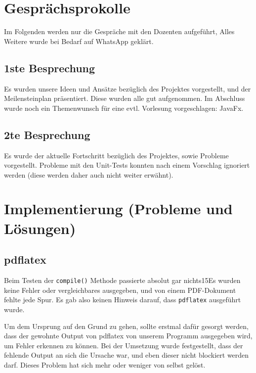 \documentclass[stu, a4paper, 11pt, floatsintext]{apa7}
\begin{document}
\clearpage

\section{Gesprächsprokolle}

\noindent Im Folgenden werden nur die Gespräche mit den Dozenten aufgeführt,
Alles Weitere wurde bei Bedarf auf WhatsApp geklärt.

\subsection{1ste Besprechung}

\noindent Es wurden unsere Ideen und Ansätze bezüglich des Projektes vorgestellt,
und der Meilensteinplan präsentiert.
Diese wurden alle gut aufgenommen.
Im Abschluss wurde noch ein Themenwunsch für eine evtl. Vorlesung vorgeschlagen: JavaFx.

\subsection{2te Besprechung}

\noindent Es wurde der aktuelle Fortschritt bezüglich des Projektes, sowie Probleme vorgestellt.
Probleme mit den Unit-Tests konnten nach einem Vorschlag ignoriert werden (diese werden daher auch nicht weiter erwähnt).

\clearpage

\section{Implementierung (Probleme und Lösungen)}

\subsection{pdflatex}

\noindent Beim Testen der \texttt{compile()} Methode passierte absolut gar nichts15Es wurden keine Fehler oder vergleichbares ausgegeben, und von einem PDF-Dokument fehlte jede Spur.
Es gab also keinen Hinweis darauf, dass \texttt{pdflatex} ausgeführt wurde.

Um dem Ursprung auf den Grund zu gehen, sollte erstmal dafür gesorgt werden,
dass der gewohnte Output von pdflatex von unserem Programm ausgegeben wird, um Fehler erkennen zu können.
Bei der Umsetzung wurde festgestellt, dass der fehlende Output an sich die Ursache war, und eben dieser nicht blockiert werden darf.
Dieses Problem hat sich mehr oder weniger von selbst gelöst.
\end{document}
